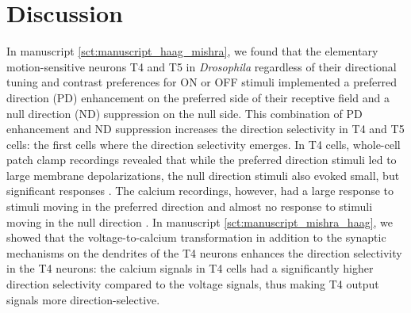 \chapter{Discussion}
\label{chp:Discussion}
In manuscript \ref{sct:manuscript_haag_mishra}, we found that the elementary motion-sensitive neurons T4 and T5 in \textit{Drosophila} regardless of their directional tuning and contrast preferences for ON or OFF stimuli implemented a preferred direction (PD) enhancement on the preferred side of their receptive field and a null direction (ND) suppression on the null side. This combination of PD enhancement and ND suppression increases the direction selectivity in T4 and T5 cells: the first cells where the direction selectivity emerges. In T4 cells, whole-cell patch clamp recordings revealed that while the preferred direction stimuli led to large membrane depolarizations, the null direction stimuli also evoked small, but significant responses \parencite{Groschner2022}. The calcium recordings, however, had a large response to stimuli moving in the preferred direction and almost no response to stimuli moving in the null direction \parencite{Maisak2013, Fisher2015}. In manuscript \ref{sct:manuscript_mishra_haag}, we showed that the voltage-to-calcium transformation in addition to the synaptic mechanisms on the dendrites of the T4 neurons enhances the direction selectivity in the T4 neurons: the calcium signals in T4 cells had a significantly higher direction selectivity compared to the voltage signals, thus making T4 output signals more direction-selective.  

